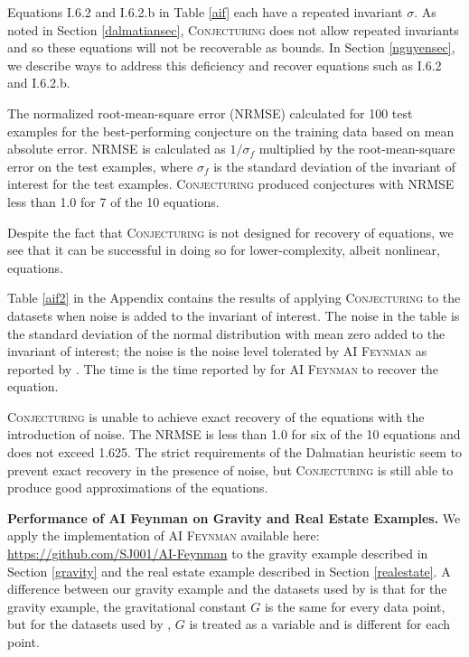 \documentclass[ijds,nonblindrev]{informs-ijds}
\begin{document}
Equations I.6.2 and I.6.2.b in Table \ref{aif} each have a repeated invariant $\sigma$.  As noted in Section \ref{dalmatiansec}, \textsc{Conjecturing} does not allow repeated invariants and so these equations will not be recoverable as bounds.  In Section \ref{nguyensec}, we describe ways to address this deficiency and recover equations such as I.6.2 and I.6.2.b.


The normalized root-mean-square error (NRMSE) calculated for 100 test examples for the best-performing conjecture on the training data based on mean absolute error. 
NRMSE is calculated as $1/\sigma_f$ multiplied by the root-mean-square error on the test examples, where $\sigma_f$ is the standard deviation of the invariant of interest for the test examples.  \textsc{Conjecturing} produced conjectures with NRMSE less than 1.0 for 7 of the 10 equations. 

Despite the fact that \textsc{Conjecturing} is not designed for recovery of equations, we see that it can be successful in doing so for lower-complexity, albeit nonlinear, equations.

Table \ref{aif2} in the Appendix contains the results of applying \textsc{Conjecturing} to the datasets when noise is added to the invariant of interest.  The noise in the table is the standard deviation of the normal distribution with mean zero added to the invariant of interest; the noise is the noise level tolerated by \textsc{AI Feynman} as reported by \citet{UdrescuTegmark20}.  The time is the time reported by \citet{UdrescuTegmark20} for \textsc{AI Feynman} to recover the equation.

\textsc{Conjecturing} is unable to achieve exact recovery of the equations with the introduction of noise.  The NRMSE is less than 1.0 for six of the 10 equations and does not exceed 1.625.  The strict requirements of the Dalmatian heuristic seem to prevent exact recovery in the presence of noise, but \textsc{Conjecturing} is still able to produce good approximations of the equations.


{\bf Performance of AI Feynman \citep{UdrescuTegmark20} on Gravity and Real Estate Examples.}  We apply the implementation of \textsc{AI Feynman} available here: \url{https://github.com/SJ001/AI-Feynman} to the gravity example described in Section \ref{gravity} and the real estate example described in Section \ref{realestate}.  A difference between our gravity example and the datasets used by \cite{UdrescuTegmark20} is that for the gravity example, the gravitational constant $G$ is the same for every data point, but for the datasets used by \cite{UdrescuTegmark20}, $G$ is treated as a variable and is different for each point.   
\end{document}
